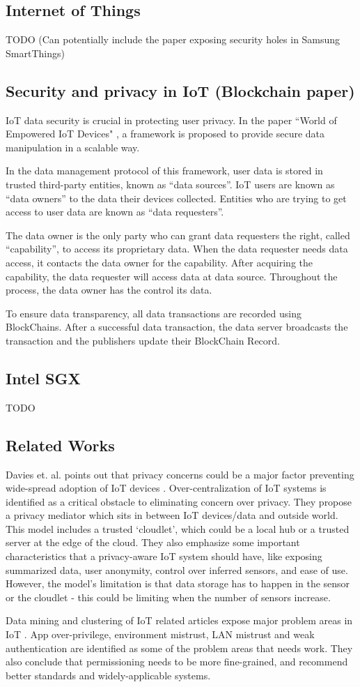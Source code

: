 \subsection{Internet of Things}
TODO
(Can potentially include the paper exposing security holes in Samsung SmartThings)

\subsection{Security and privacy in IoT (Blockchain paper)}
IoT data security is crucial in protecting user privacy. In the paper ``World of Empowered IoT Devices" \cite{campbell}, a framework is proposed to provide secure data manipulation in a scalable way.

In the data management protocol of this framework, user data is stored in trusted third-party entities, known as “data sources”. IoT users are known as “data owners” to the data their devices collected. Entities who are trying to get access to user data are known as “data requesters”. 

The data owner is the only party who can grant data requesters the right, called “capability”, to access its proprietary data. When the data requester needs data access, it contacts the data owner for the capability. After acquiring the capability, the data requester will access data at data source. Throughout the process, the data owner has the control its data.

To ensure data transparency, all data transactions are recorded using BlockChains. After a successful data transaction, the data server broadcasts the transaction and the publishers update their BlockChain Record. 

\subsection{Intel SGX}
TODO

\subsection{Related Works}
Davies et. al. points out that privacy concerns could be a major factor preventing wide-spread adoption of IoT devices \cite{davies}. Over-centralization of IoT systems is identified as a critical obstacle to eliminating concern over privacy. They propose a privacy mediator which sits in between IoT devices/data and outside world. This model includes a trusted `cloudlet', which could be a local hub or a trusted server at the edge of the cloud. They also emphasize some important characteristics that a privacy-aware IoT system should have, like exposing summarized data, user anonymity, control over inferred sensors, and ease of use. However, the model's limitation is that data storage has to happen in the sensor or the cloudlet - this could be limiting when the number of sensors increase.

Data mining and clustering of IoT related articles expose major problem areas in IoT \cite{zhang}. App over-privilege, environment mistrust, LAN mistrust and weak authentication are identified as some of the problem areas that needs work. They also conclude that permissioning needs to be more fine-grained, and recommend better standards and widely-applicable systems.